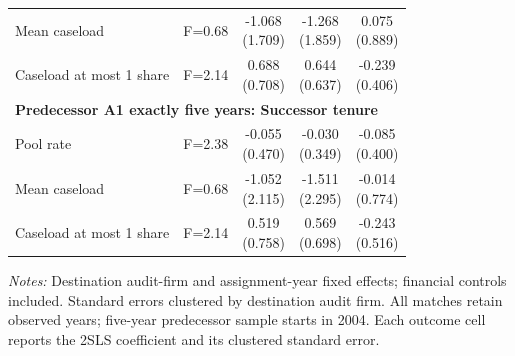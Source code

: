 \documentclass[10pt]{article}
\begin{document}
\begin{minipage}{19cm}
\begin{threeparttable}
\begin{tabular}{p{}cccc}
Mean caseload & F=0.68 & \shortstack{-1.068\\(1.709)} & \shortstack{-1.268\\(1.859)} & \shortstack{0.075\\(0.889)} \\
Caseload at most 1 share & F=2.14 & \shortstack{0.688\\(0.708)} & \shortstack{0.644\\(0.637)} & \shortstack{-0.239\\(0.406)} \\
\multicolumn{5}{l}{\textbf{Predecessor A1 exactly five years: Successor tenure}} \\
Pool rate & F=2.38 & \shortstack{-0.055\\(0.470)} & \shortstack{-0.030\\(0.349)} & \shortstack{-0.085\\(0.400)} \\
Mean caseload & F=0.68 & \shortstack{-1.052\\(2.115)} & \shortstack{-1.511\\(2.295)} & \shortstack{-0.014\\(0.774)} \\
Caseload at most 1 share & F=2.14 & \shortstack{0.519\\(0.758)} & \shortstack{0.569\\(0.698)} & \shortstack{-0.243\\(0.516)} \\
\bottomrule
\end{tabular}
\begin{tablenotes}\fontsize{9}{11}\selectfont
\item \raggedright \fontsize{9}{11}\selectfont \textit{Notes:} Destination audit-firm and assignment-year fixed effects; financial controls included. Standard errors clustered by destination audit firm. All matches retain observed years; five-year predecessor sample starts in 2004. Each outcome cell reports the 2SLS coefficient and its clustered standard error.
\end{tablenotes}
\end{threeparttable}

\end{minipage}
\end{document}
